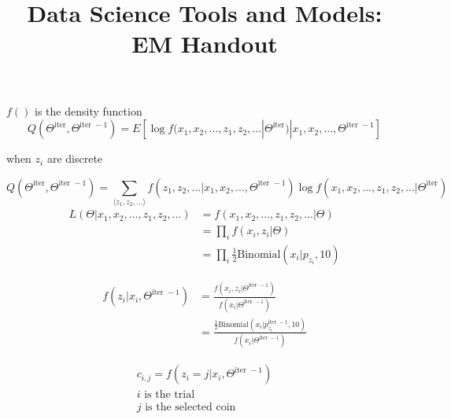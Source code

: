 \documentclass{article}
\title{Data Science Tools and Models: EM Handout}
\date{}
\begin{document}
\maketitle
\thispagestyle{fancy}

$f()$ is the density function
	$$Q(\Theta^{\textrm{iter}}, \Theta^{\textrm{iter }-1}) = E \left[ \log f (x_1, x_2, ..., z_1, z_2, ... | \Theta^{\textrm{iter}}) |
			x_1,  x_2, ..., \Theta^{\textrm{iter }-1} \right]$$

when $z_i$ are discrete

		$$Q(\Theta^{\textrm{iter}}, \Theta^{\textrm{iter }-1}) =
			\sum_{\langle z_1, z_2, ... \rangle} f (z_1, z_2, ... | x_1,  x_2, ..., \Theta^{\textrm{iter }-1}) 
				\log f (x_1, x_2, ..., z_1, z_2, ... | \Theta^{\textrm{iter}})$$
	\begin{align}
	L (\Theta | x_1, x_2, ..., z_1, z_2, ...) &= f (x_1, x_2, ..., z_1, z_2, ... | \Theta) \nonumber \\
		&= \prod_i f (x_i, z_i | \Theta) \nonumber \\
		&= \prod_i \frac{1}{2} \textrm {Binomial}(x_i | p_{z_i}, 10) \nonumber
	\end{align}


	\begin{align}
	f (z_i | x_i, \Theta^{\textrm{iter }-1}) &= 
		\frac{f (x_i, z_i | \Theta^{\textrm{iter }-1})}
		{f (x_i | \Theta^{\textrm{iter }-1})} \nonumber \\
	&= \frac{\frac{1}{2} \textrm {Binomial}(x_i | p_{z_i}^{\textrm{iter }-1}, 10)}
		{f (x_i | \Theta^{\textrm{iter }-1})} \nonumber
	\end{align}

	\begin{align}
c_{i, j} = f (z_i = j | x_i, \Theta^{\textrm{iter }-1})  \nonumber \\
i \textrm{ is the trial} \nonumber \\
j \textrm{ is the selected coin} \nonumber \\
	\end{align}
\vspace{2 em}
\end{document}
